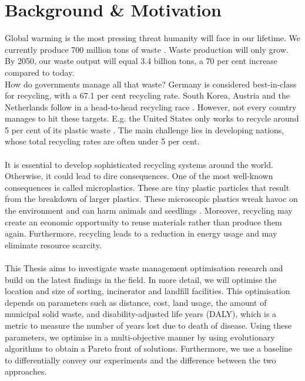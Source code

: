 \documentclass[mscthesis, 11pt]{usiinfthesis}
\theoremstyle{newdefinition}
\begin{document}
\chapter{Background \& Motivation}
Global warming is the most pressing threat humanity will face in our lifetime. We currently produce 700 million tons of waste \cite{oecd_waste_2019}. Waste production will only grow. By 2050, our waste output will equal 3.4 billion tons, a 70 per cent increase compared to today. \cite{tiseo_global_2022} \\
How do governments manage all that waste? Germany is considered best-in-class for recycling, with a 67.1 per cent recycling rate. South Korea, Austria and the Netherlands follow in a head-to-head recycling race \cite{statista_global_2022}.  However, not every country manages to hit these targets. E.g. the United States only works to recycle around 5 per cent of its plastic waste \cite{volcovici_us_2022}. The main challenge lies in developing nations, whose total recycling rates are often under 5 per cent. \cite{statista_global_2022}\\
\\
It is essential to develop sophisticated recycling systems around the world. Otherwise, it could lead to dire consequences. One of the most well-known consequences is called microplastics. These are tiny plastic particles that result from the breakdown of larger plastics. These microscopic plastics wreak havoc on the environment and can harm animals and seedlings \cite{national_geographic_society_microplastics_2022}. Moreover, recycling may create an economic opportunity to reuse materials rather than produce them again. Furthermore, recycling leads to a reduction in energy usage and may eliminate resource scarcity. 
\\\\
This Thesis aims to investigate waste management optimisation research and build on the latest findings in the field. In more detail, we will optimise the location and size of sorting, incinerator and landfill facilities. This optimisation depends on parameters such as distance, cost, land usage, the amount of municipal solid waste, and disability-adjusted life years (DALY), which is a metric to measure the number of years lost due to death of disease. \cite{murray_quantifying_1994} Using these parameters, we optimise in a multi-objective manner by using evolutionary algorithms to obtain a Pareto front of solutions. Furthermore, we use a baseline to differentially convey our experiments and the difference between the two approaches.
\end{document}
